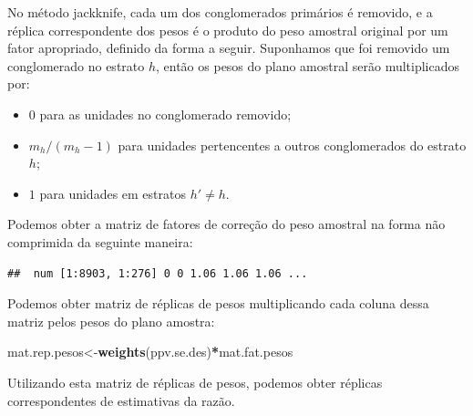 \documentclass[]{book}
\newenvironment{Shaded}{\begin{snugshade}}{\end{snugshade}}
\newcommand{\KeywordTok}[1]{\textcolor[rgb]{0.13,0.29,0.53}{\textbf{#1}}}
\newcommand{\DecValTok}[1]{\textcolor[rgb]{0.00,0.00,0.81}{#1}}
\newcommand{\StringTok}[1]{\textcolor[rgb]{0.31,0.60,0.02}{#1}}
\newcommand{\ControlFlowTok}[1]{\textcolor[rgb]{0.13,0.29,0.53}{\textbf{#1}}}
\newcommand{\OperatorTok}[1]{\textcolor[rgb]{0.81,0.36,0.00}{\textbf{#1}}}
\newcommand{\NormalTok}[1]{#1}
\providecommand{\tightlist}{%
  \setlength{\itemsep}{0pt}\setlength{\parskip}{0pt}}
\theoremstyle{definition}
\theoremstyle{definition}
\theoremstyle{definition}
\theoremstyle{remark}
\begin{document}
No método jackknife, cada um dos conglomerados primários é removido, e a
réplica correspondente dos pesos é o produto do peso amostral original
por um fator apropriado, definido da forma a seguir. Suponhamos que foi
removido um conglomerado no estrato \(h\), então os pesos do plano
amostral serão multiplicados por:

\begin{itemize}
\tightlist
\item
  \(0\) para as unidades no conglomerado removido;
\item
  \(m_h/(m_h-1)\) para unidades pertencentes a outros conglomerados do
  estrato \(h\);
\item
  \(1\) para unidades em estratos \(h'\neq h\).
\end{itemize}

Podemos obter a matriz de fatores de correção do peso amostral na forma
não comprimida da seguinte maneira:

\begin{Shaded}
\end{Shaded}

\begin{verbatim}
##  num [1:8903, 1:276] 0 0 1.06 1.06 1.06 ...
\end{verbatim}

Podemos obter matriz de réplicas de pesos multiplicando cada coluna
dessa matriz pelos pesos do plano amostra:

\begin{Shaded}
\begin{Highlighting}[]
\NormalTok{mat.rep.pesos<-}\KeywordTok{weights}\NormalTok{(ppv.se.des)}\OperatorTok{*}\NormalTok{mat.fat.pesos}
\end{Highlighting}
\end{Shaded}

Utilizando esta matriz de réplicas de pesos, podemos obter réplicas
correspondentes de estimativas da razão.

\begin{Shaded}
\end{Shaded}
\end{document}
